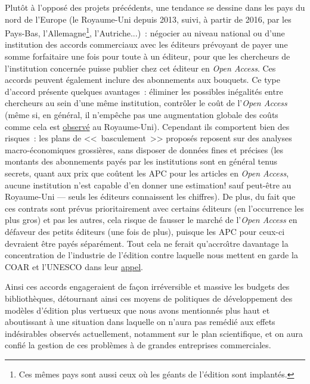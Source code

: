 Plut{\^o}t {\`a} l'oppos{\'e} des projets pr{\'e}c{\'e}dents, une tendance se dessine dans les pays du nord de l'Europe (le Royaume-Uni depuis
2013, suivi, {\`a} partir de 2016, par les Pays-Bas, l'Allemagne\footnote{Ces m{\^e}mes pays sont aussi ceux o{\`u} les g{\'e}ants
de l'{\'e}dition sont implant{\'e}s.}, l'Autriche...)~:
n{\'e}gocier au niveau national ou d'une institution des accords commerciaux avec les {\'e}diteurs pr{\'e}voyant de payer une somme forfaitaire une fois pour
toute {\`a} un {\'e}diteur, pour que les chercheurs de l'institution concern{\'e}e puisse publier chez cet {\'e}diteur en \emph{Open Access}.
Ces accords peuvent {\'e}galement
inclure des abonnements aux bouquets. Ce type d'accord pr{\'e}sente quelques avantages~: {\'e}liminer les possibles in{\'e}galit{\'e}s entre chercheurs au sein d'une m{\^e}me
institution, contr{\^o}ler le co{\^u}t de l'\emph{Open Access} (m{\^e}me si, en g{\'e}n{\'e}ral, il n'emp{\^e}che pas une augmentation globale des co{\^u}ts
comme cela est \href{http://www.eprist.fr/wp-content/uploads/2016/11/I-IST_24EtudeJISC.pdf}{observ{\'e}} au Royaume-Uni). Cependant ils comportent
bien des risques~: les plans de <<~basculement~>> propos{\'e}s reposent sur des analyses macro-{\'e}conomiques grossi{\`e}res, sans disposer de donn{\'e}es fines et pr{\'e}cises
(les montants des abonnements pay{\'e}s par les institutions sont en g{\'e}n{\'e}ral tenus secrets, quant aux prix que co{\^u}tent les APC pour les articles en
\emph{Open Access}, aucune institution n'est capable d'en donner une estimation! sauf peut-{\^e}tre au Royaume-Uni --- seuls les {\'e}diteurs connaissent
les chiffres). De plus, du fait que ces contrats sont pr{\'e}vus prioritairement avec certains {\'e}diteurs (en l'occurrence les plus gros) et pas les autres,
cela risque de fausser le march{\'e} de l'\emph{Open Access} en d{\'e}faveur des petits {\'e}diteurs (une fois de plus), puisque les APC pour ceux-ci devraient
{\^e}tre pay{\'e}s s{\'e}par{\'e}ment. Tout cela ne ferait qu'accro{\^\i}tre davantage la concentration de l'industrie de l'{\'e}dition
contre laquelle nous mettent en garde la COAR et
l'UNESCO dans leur 
\href{http://www.unesco.org/new/fileadmin/MULTIMEDIA/HQ/CI/CI/pdf/news/coar_unesco_oa_statement.pdf}{appel}.

Ainsi ces accords engageraient de fa{\c c}on irr{\'e}versible et massive les budgets des biblioth{\`e}ques, d{\'e}tournant ainsi ces moyens
de politiques de d{\'e}veloppement des mod{\`e}les d'{\'e}dition plus vertueux que nous avons mentionn{\'e}s plus haut et aboutissant {\`a}
une situation dans laquelle on n'aura pas rem{\'e}di{\'e} aux effets ind{\'e}sirables observ{\'e}s actuellement, notamment sur le plan scientifique,
et on aura confi{\'e} la gestion de ces probl{\`e}mes {\`a} de grandes entreprises commerciales.


